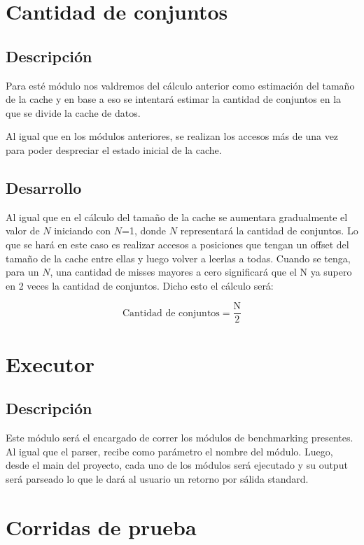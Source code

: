 \documentclass[a4paper,10pt]{article}
\begin{document}
\section{Cantidad de conjuntos}

\subsection{Descripción}

Para esté módulo nos valdremos del cálculo anterior como estimación del tamaño de la cache y en base a eso se intentará estimar la cantidad de conjuntos en la que se divide la cache de datos.

Al igual que en los módulos anteriores, se realizan los accesos más de una vez para poder despreciar el estado inicial de la cache.

\subsection{Desarrollo}

Al igual que en el cálculo del tamaño de la cache se aumentara gradualmente el valor de $N$ iniciando con $N$=1, donde $N$ representará la cantidad de conjuntos.
Lo que se hará en este caso es realizar accesos a posiciones que tengan un offset del tamaño de la cache entre ellas y luego volver a leerlas a todas. Cuando se tenga, para un $N$, una cantidad de misses mayores a cero significará que el N ya supero en 2 veces la cantidad de conjuntos. Dicho esto el cálculo será:

\[ \text{Cantidad de conjuntos}
  = \dfrac{\text{N}}{\text{2}}
\]


\section{Executor}
\subsection{Descripción}

Este módulo será el encargado de correr los módulos de benchmarking presentes. Al igual que el parser, recibe como parámetro el nombre del módulo. Luego, desde el main del proyecto, cada uno de los módulos será ejecutado y su output será parseado lo que le dará al usuario un retorno por sálida standard.

\section{Corridas de prueba}
\end{document}
